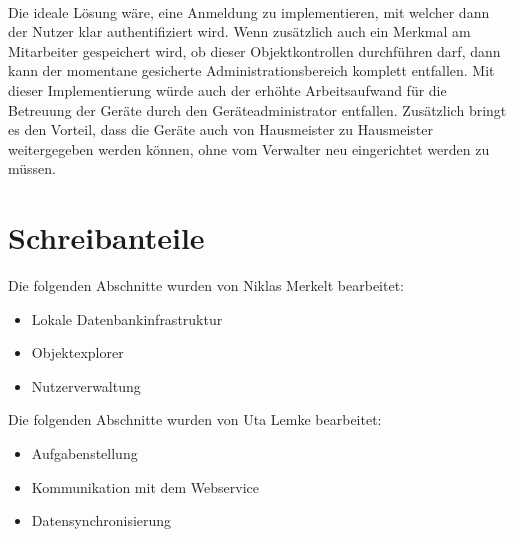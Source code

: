 \documentclass[12pt]{article}
\begin{document}
\paragraph{}Die ideale Lösung wäre, eine Anmeldung zu implementieren, mit welcher dann der Nutzer klar authentifiziert wird. Wenn zusätzlich auch ein Merkmal am Mitarbeiter gespeichert wird, ob dieser Objektkontrollen durchführen darf, dann kann der momentane gesicherte Administrationsbereich komplett entfallen. Mit dieser Implementierung würde auch der erhöhte Arbeitsaufwand für die Betreuung der Geräte durch den Geräteadministrator entfallen. Zusätzlich bringt es den Vorteil, dass die Geräte auch von Hausmeister zu Hausmeister weitergegeben werden können, ohne vom Verwalter neu eingerichtet werden zu müssen.

\newpage
\section{Schreibanteile}

Die folgenden Abschnitte wurden von Niklas Merkelt bearbeitet:
\begin{itemize}
	\item Lokale Datenbankinfrastruktur
	\item Objektexplorer
	\item Nutzerverwaltung
\end{itemize}
Die folgenden Abschnitte wurden von Uta Lemke bearbeitet:
\begin{itemize}
	\item Aufgabenstellung
	\item Kommunikation mit dem Webservice
	\item Datensynchronisierung
\end{itemize}
\end{document}
